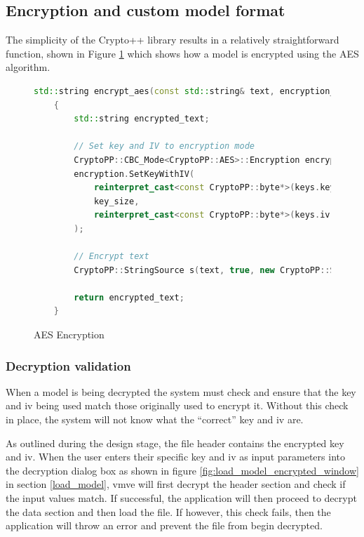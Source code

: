 \documentclass[11pt]{article}
\begin{document}
\subsection{Encryption and custom model format}
The simplicity of the Crypto++ library results in a relatively straightforward
function, shown in Figure \ref{fig:aes_encryption} which shows how a model is
encrypted using the AES algorithm.
\begin{figure}[H]
  \centering
  \begin{lstlisting}[language=C++]
    std::string encrypt_aes(const std::string& text, encryption_keys& keys, int key_size)
    {
        std::string encrypted_text;

        // Set key and IV to encryption mode
        CryptoPP::CBC_Mode<CryptoPP::AES>::Encryption encryption;
        encryption.SetKeyWithIV(
            reinterpret_cast<const CryptoPP::byte*>(keys.key.data()), 
            key_size, 
            reinterpret_cast<const CryptoPP::byte*>(keys.iv.data())
        );

        // Encrypt text
        CryptoPP::StringSource s(text, true, new CryptoPP::StreamTransformationFilter(encryption, new CryptoPP::StringSink(encrypted_text)));

        return encrypted_text;
    }
  \end{lstlisting}
  \caption{AES Encryption}
  \label{fig:aes_encryption}
\end{figure}


\subsubsection{Decryption validation}
When a model is being decrypted the system must check and ensure that the key
and iv being used match those originally used to encrypt it. Without this check
in place, the system will not know what the ``correct'' key and iv are.

As outlined during the design stage, the file header contains the encrypted key
and iv. When the user enters their specific key and iv as input parameters into
the decryption dialog box as shown in figure
\ref{fig:load_model_encrypted_window} in section \ref{load_model}, \gls*{vmve}
will first decrypt the header section and check if the input values match. If
successful, the application will then proceed to decrypt the data section and
then load the file. If however, this check fails, then the application will
throw an error and prevent the file from begin decrypted.
\end{document}
